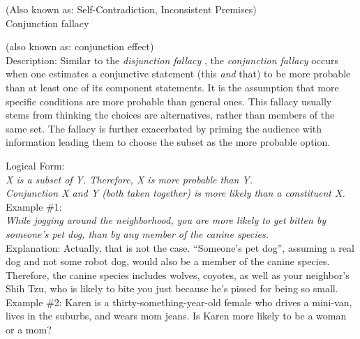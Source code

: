 \documentclass[a4paper,12pt,single,pdftex]{scrbook}
\begin{document}
    
  
    
      (Also known as: Self-Contradiction, Inconsistent Premises)
    \\

  

Conjunction fallacy
    
      (also known as: conjunction effect)
    \\

  
    Description: Similar to the {\it disjunction fallacy} , the {\em conjunction fallacy} occurs when one estimates a conjunctive statement (this {\em and}  that) to be more probable than at least one of its component statements. It is the assumption that more specific conditions are more probable than general ones.  This fallacy usually stems from thinking the choices are alternatives, rather than members of the same set.  The fallacy is further exacerbated by priming the audience with information leading them to choose the subset as the more probable option.

    
      Logical Form:
    \\

    
      {\em X is a subset of Y. \newline
Therefore, X is more probable than Y.}
    \\

    
      {\em Conjunction X and Y (both taken together) is more likely than a constituent X.}
    \\

    
      Example \#1:
    \\

    
      {\em While jogging around the neighborhood, you are more likely to get bitten by someone’s pet dog, than by any member of the canine species.}
    \\

    
      Explanation: Actually, that is not the case.  “Someone’s pet dog”, assuming a real dog and not some robot dog, would also be a member of the canine species.  Therefore, the canine species includes wolves,  coyotes, as well as your neighbor’s Shih Tzu, who is likely to bite you just because he’s pissed for being so small.
    \\

    
      Example \#2: Karen is a thirty-something-year-old female who drives a mini-van, lives in the suburbs, and wears mom jeans. Is Karen more likely to be a woman or a mom?
    \\
\end{document}
